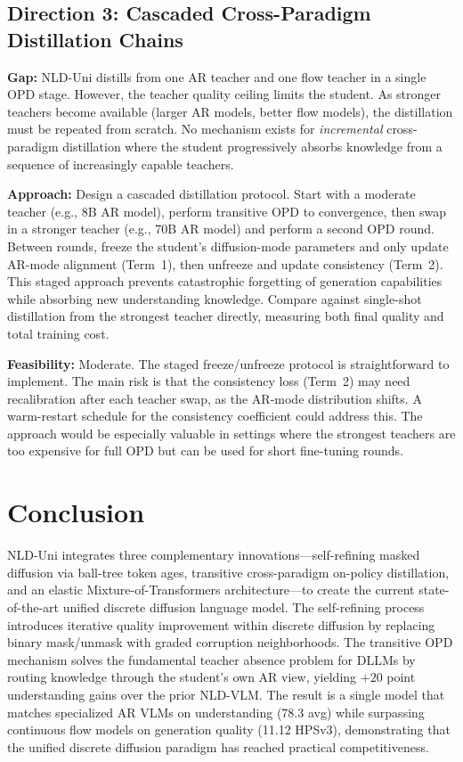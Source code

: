 \documentclass[11pt,a4paper]{article}
\begin{document}
\subsection{Direction 3: Cascaded Cross-Paradigm Distillation Chains}
\textbf{Gap:} NLD-Uni distills from one AR teacher and one flow teacher in a single OPD stage. However, the teacher quality ceiling limits the student. As stronger teachers become available (larger AR models, better flow models), the distillation must be repeated from scratch. No mechanism exists for \emph{incremental} cross-paradigm distillation where the student progressively absorbs knowledge from a sequence of increasingly capable teachers.

\textbf{Approach:} Design a cascaded distillation protocol. Start with a moderate teacher (e.g., 8B AR model), perform transitive OPD to convergence, then swap in a stronger teacher (e.g., 70B AR model) and perform a second OPD round. Between rounds, freeze the student's diffusion-mode parameters and only update AR-mode alignment (Term~1), then unfreeze and update consistency (Term~2). This staged approach prevents catastrophic forgetting of generation capabilities while absorbing new understanding knowledge. Compare against single-shot distillation from the strongest teacher directly, measuring both final quality and total training cost.

\textbf{Feasibility:} Moderate. The staged freeze/unfreeze protocol is straightforward to implement. The main risk is that the consistency loss (Term~2) may need recalibration after each teacher swap, as the AR-mode distribution shifts. A warm-restart schedule for the consistency coefficient could address this. The approach would be especially valuable in settings where the strongest teachers are too expensive for full OPD but can be used for short fine-tuning rounds.

\section{Conclusion}
NLD-Uni integrates three complementary innovations---self-refining masked diffusion via ball-tree token ages, transitive cross-paradigm on-policy distillation, and an elastic Mixture-of-Transformers architecture---to create the current state-of-the-art unified discrete diffusion language model. The self-refining process introduces iterative quality improvement within discrete diffusion by replacing binary mask/unmask with graded corruption neighborhoods. The transitive OPD mechanism solves the fundamental teacher absence problem for DLLMs by routing knowledge through the student's own AR view, yielding $+20$ point understanding gains over the prior NLD-VLM. The result is a single model that matches specialized AR VLMs on understanding (78.3 avg) while surpassing continuous flow models on generation quality (11.12 HPSv3), demonstrating that the unified discrete diffusion paradigm has reached practical competitiveness.
\end{document}
